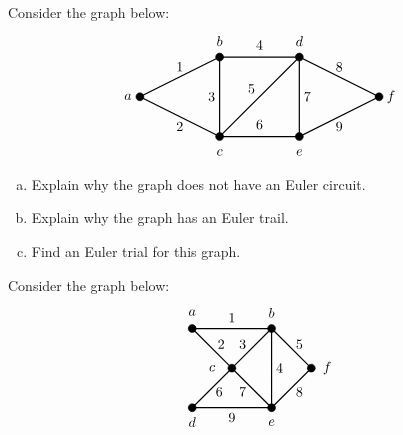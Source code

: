 \documentclass[12pt,letterpaper]{exam}
\begin{document}
\begin{questions}
\newpage
\question[10]  Consider the graph below:
	\[
	\begin{tikzpicture}
	\draw[line width=0.03cm] (0,2) -- (-2,1) -- (0,0);
	\draw[line width=0.03cm] (2,2) -- (0,2) -- (0,0) -- (2,0) -- (4,1) -- (2,2) -- (2,0);
	\draw[line width=0.03cm] (0,0) -- (2,2);
	
	\draw[fill=black] (-2,1) circle (0.1);
	\draw[fill=black] (0,0) circle (0.1);
	\draw[fill=black] (0,2) circle (0.1);
	\draw[fill=black] (2,0) circle (0.1);
	\draw[fill=black] (2,2) circle (0.1);
	\draw[fill=black] (4,1) circle (0.1);
	
	\node at (-2.3,1) {$a$};
	\node at (0,2.4) {$b$};
	\node at (0,-0.4) {$c$};
	\node at (2,2.4) {$d$};
	\node at (2,-0.4) {$e$};
	\node at (4.3,1) {$f$};
	
	\node at (-1,1.75) {$1$};
	\node at (-1,0.25) {$2$};
	\node at (-0.2,1) {$3$};
	\node at (1,2.3) {$4$};
	\node at (0.8,1.2) {$5$};
	\node at (1,0.3) {$6$};
	\node at (2.2,1) {$7$};
	\node at (3,1.75) {$8$};
	\node at (3,0.25) {$9$};
	\end{tikzpicture}
	\]

\begin{enumerate}[(a)]
\item Explain why the graph does not have an Euler circuit. 
\item Explain why the graph has an Euler trail. 
\item Find an Euler trial for this graph. 
\end{enumerate}



\newpage
\question[10] Consider the graph below:
	\[
	\begin{tikzpicture}
	\draw[line width=0.03cm] (2,2) -- (3,1) -- (2,0) -- (2,2) -- (0,2) -- (1,1) -- (0,0) -- (2,0) -- (1,1) -- (2,2);
	
	\draw[fill=black] (0,0) circle (0.1);
	\draw[fill=black] (2,0) circle (0.1);
	\draw[fill=black] (0,2) circle (0.1);
	\draw[fill=black] (2,2) circle (0.1);
	\draw[fill=black] (1,1) circle (0.1);
	\draw[fill=black] (3,1) circle (0.1);
	
	\node at (0,2.4) {$a$};
	\node at (2,2.4) {$b$};
	\node at (0.5,1) {$c$};
	\node at (0,-0.36) {$d$};
	\node at (2,-0.38) {$e$};
	\node at (3.4,1) {$f$};
	
	\node at (1,2.27) {$1$};
	\node at (0.73,1.6) {$2$};
	\node at (1.27,1.6) {$3$};
	\node at (2.2,1) {$4$};
	\node at (2.7,1.6) {$5$};
	\node at (0.68,0.4) {$6$};
	\node at (1.27,0.4) {$7$};
	\node at (2.7,0.4) {$8$};
	\node at (1,-0.25) {$9$};
	\end{tikzpicture}
	\]


\end{questions}
\end{document}
